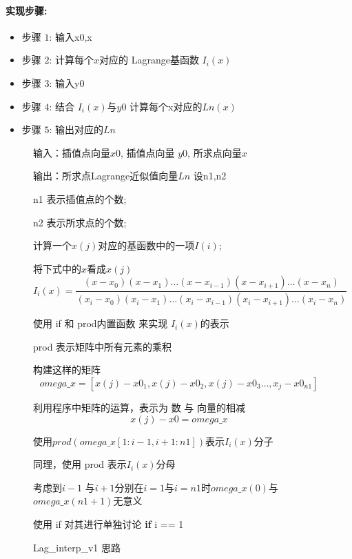 \documentclass{xtupaper}
\begin{document}
	
	\paragraph{实现步骤:}
	
	\begin{itemize}
		\item 步骤 $1$: 输入x0,x	
		\item 步骤 $2$: 计算每个$ x $对应的 Lagrange基函数 $ I_i(x) $
		\item 步骤 $3$: 输入y0
		\item 步骤 $4$: 结合 $I_i(x) $与$ y0 $ 计算每个x对应的$ Ln(x) $
		\item 步骤 $5$: 输出对应的$ Ln $
	\end{itemize}
\begin{figure}

	\begin{algorithm}[H]
		\caption{ Lag\_interp\_v1 思路}
		\label{alg:Framwork}
		\begin{algorithmic}
			\State 输入：插值点向量$x0$, 插值点向量 $y0$, 所求点向量$x$
			
			\State 输出：所求点Lagrange近似值向量$Ln$
			\newline
			\State 设n1,n2
			
			 n1 表示插值点的个数;
			
			n2 表示所求点的个数;
			
			\State 计算一个$x(j)$对应的基函数中的一项$I(i)$;
			
			将下式中的$ x $看成$ x(j) $
			\[I_i(x)=\frac{(x-x_0)(x-x_1)\dots(x-x_{i-1})(x-x_{i+1})\dots(x-x_n)}{(x_i-x_0)(x_i-x_1)\dots(x_i-x_{i-1})(x_i-x_{i+1})\dots(x_i-x_n)}\]
			
			\State 使用 if 和 prod内置函数 来实现 $ I_i(x) $的表示
				
				 prod 表示矩阵中所有元素的乘积
				
				构建这样的矩阵  \[ omega\_x =[x(j)-x0_1,x(j)-x0_2,x(j)-x0_3\dots,x_j-x0_{n1}] \]
				
				利用程序中矩阵的运算，表示为 数 与 向量的相减
				\[ x(j) - x0 = omega\_x\]
				
				使用$ prod(omega\_x[1:i-1,i+1:n1]) $表示$ I_i(x) $分子
				
				同理，使用 prod 表示$ I_i(x) $分母
				
				考虑到$ i-1 $ 与$ i+1 $分别在$ i=1 $与$ i=n1 $时$ omega\_x(0) $与$ omega\_x(n1+1) $无意义
				
				使用 if 对其进行单独讨论
			\State\textbf{if} i == 1
			

\end{algorithmic}
\end{algorithm}
\end{figure}
\end{document}
